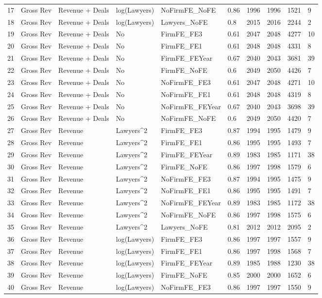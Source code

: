 \begin{table}[ht]
\begin{tabular}{rlllllllll}
  17 & Gross Rev & Revenue + Deals & log(Lawyers) & NoFirmFE\_NoFE & 0.86 & 1996 & 1996 & 1521 & 9 \\ 
  18 & Gross Rev & Revenue + Deals & log(Lawyers) & Lawyers\_NoFE & 0.8 & 2015 & 2016 & 2244 & 2 \\ 
  19 & Gross Rev & Revenue + Deals & No & FirmFE\_FE3 & 0.61 & 2047 & 2048 & 4277 & 10 \\ 
  20 & Gross Rev & Revenue + Deals & No & FirmFE\_FE1 & 0.61 & 2048 & 2048 & 4331 & 8 \\ 
  21 & Gross Rev & Revenue + Deals & No & FirmFE\_FEYear & 0.67 & 2040 & 2043 & 3681 & 39 \\ 
  22 & Gross Rev & Revenue + Deals & No & FirmFE\_NoFE & 0.6 & 2049 & 2050 & 4426 & 7 \\ 
  23 & Gross Rev & Revenue + Deals & No & NoFirmFE\_FE3 & 0.61 & 2047 & 2048 & 4271 & 10 \\ 
  24 & Gross Rev & Revenue + Deals & No & NoFirmFE\_FE1 & 0.61 & 2048 & 2048 & 4319 & 8 \\ 
  25 & Gross Rev & Revenue + Deals & No & NoFirmFE\_FEYear & 0.67 & 2040 & 2043 & 3698 & 39 \\ 
  26 & Gross Rev & Revenue + Deals & No & NoFirmFE\_NoFE & 0.6 & 2049 & 2050 & 4420 & 7 \\ 
  27 & Gross Rev & Revenue & Lawyers^2 & FirmFE\_FE3 & 0.87 & 1994 & 1995 & 1479 & 9 \\ 
  28 & Gross Rev & Revenue & Lawyers^2 & FirmFE\_FE1 & 0.86 & 1995 & 1995 & 1493 & 7 \\ 
  29 & Gross Rev & Revenue & Lawyers^2 & FirmFE\_FEYear & 0.89 & 1983 & 1985 & 1171 & 38 \\ 
  30 & Gross Rev & Revenue & Lawyers^2 & FirmFE\_NoFE & 0.86 & 1997 & 1998 & 1579 & 6 \\ 
  31 & Gross Rev & Revenue & Lawyers^2 & NoFirmFE\_FE3 & 0.87 & 1994 & 1995 & 1475 & 9 \\ 
  32 & Gross Rev & Revenue & Lawyers^2 & NoFirmFE\_FE1 & 0.86 & 1995 & 1995 & 1491 & 7 \\ 
  33 & Gross Rev & Revenue & Lawyers^2 & NoFirmFE\_FEYear & 0.89 & 1983 & 1985 & 1172 & 38 \\ 
  34 & Gross Rev & Revenue & Lawyers^2 & NoFirmFE\_NoFE & 0.86 & 1997 & 1998 & 1575 & 6 \\ 
  35 & Gross Rev & Revenue & Lawyers^2 & Lawyers\_NoFE & 0.81 & 2012 & 2012 & 2095 & 2 \\ 
  36 & Gross Rev & Revenue & log(Lawyers) & FirmFE\_FE3 & 0.86 & 1997 & 1997 & 1557 & 9 \\ 
  37 & Gross Rev & Revenue & log(Lawyers) & FirmFE\_FE1 & 0.86 & 1997 & 1998 & 1568 & 7 \\ 
  38 & Gross Rev & Revenue & log(Lawyers) & FirmFE\_FEYear & 0.89 & 1985 & 1988 & 1230 & 38 \\ 
  39 & Gross Rev & Revenue & log(Lawyers) & FirmFE\_NoFE & 0.85 & 2000 & 2000 & 1652 & 6 \\ 
  40 & Gross Rev & Revenue & log(Lawyers) & NoFirmFE\_FE3 & 0.86 & 1997 & 1997 & 1550 & 9 \\ 
   \hline
\end{tabular}
\end{table}

